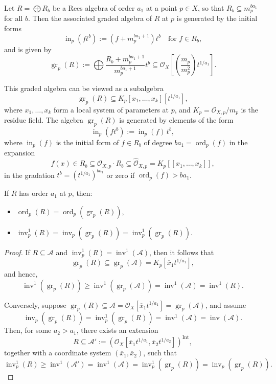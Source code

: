 \documentclass{amsart}
\newcommand{\inn}{\operatorname{in}}
\newcommand{\ord}{{\operatorname{ord}}}
\newcommand{\gr}{{\operatorname{gr}}}
\newcommand{\inv}{{\operatorname{inv}}}
\begin{document}
\begin{lemma} \label{g2}
Let \( R = \bigoplus R_b \) be a Rees algebra of order \( a_1 \) at a point \( p \in X \), so that \( R_b \subseteq m_p^{b a_1} \) for all \( b \). Then the associated graded algebra of \( R \) at \( p \) is generated by the initial forms
\[
\inn_p(f t^b) := (f + m_p^{b a_1 + 1}) t^b \quad \text{for } f \in R_b,
\]
and is given by
\[
\gr_p(R) := \bigoplus \frac{R_b + m_p^{b a_1 + 1}}{m_p^{b a_1 + 1}} t^b 
\subseteq \mathcal{O}_X\left[\left( \frac{m_p}{m_p^2} \right) t^{1/a_1} \right].
\]

This graded algebra can be viewed as a subalgebra
\[
\gr_p(R) \subseteq K_p[x_1, \ldots, x_k][t^{1/a_1}],
\]
where \( x_1, \ldots, x_k \) form a local system of parameters at \( p \), and \( K_p = \mathcal{O}_{X, p} / m_p \) is the residue field. The algebra \( \gr_p(R) \) is generated by elements of the form
\[
\inn_p(f t^b) := \inn_p(f)\, t^b,
\]
where \( \inn_p(f) \) is the initial form of \( f \in R_b \) of degree \( b a_1 = \ord_p(f) \) in the expansion
\[
f(x) \in R_b \subseteq \widehat{\mathcal{O}}_{X, p} \cdot R_b \subseteq \widehat{\mathcal{O}}_{X, p} = K_p[[x_1, \ldots, x_k]],
\]
in the gradation $t^b=(t^{1/a_1})^{ba_1}$ or zero if \( \ord_p(f) > b a_1 \).

\end{lemma}%
\begin{lemma}\label{g3}
If $R$ has order $a_1$ at $p$, then:
\begin{itemize}
  \item $\ord_p(R) = \ord_p(\gr_p(R))$,
  \item $\inv_p^1(R) = \inv_p(\gr_p(R)) = \inv_p^1(\gr_p(R))$.
\end{itemize}
\end{lemma}
\begin{proof}
If \( R \subseteq \mathcal{A} \) and \( \inv^1_p(R) = \inv^1(\mathcal{A}) \), then it follows that
\[
\gr_p(R) \subseteq \gr_p(\mathcal{A})=K_p[\overline{x}_1 t^{1/a_1}],
\]
and hence,
\[
\inv^1(\gr_p(R)) \geq \inv^1(\gr_p(\mathcal{A})) = \inv^1(\mathcal{A})= \inv^1(R).
\]

Conversely, suppose \( \gr_p(R) \subseteq \mathcal{A} = \mathcal{O}_X[\overline{x}_1 t^{1/a_1}]=\gr_p(\mathcal{A} )\), and assume
\[
\inv_p(\gr_p(R)) = \inv^1_p(\gr_p(R)) = \inv^1(\mathcal{A}) = \inv(\mathcal{A}).
\]
Then, for some \( a_2 > a_1 \), there exists an extension
\[
R \subseteq \mathcal{A}' := \left( \mathcal{O}_X[\overline{x}_1 t^{1/a_1}, \overline{x}_2 t^{1/a_2}] \right)^{\mathrm{Int}},
\]
together with a coordinate system \( (\overline{x}_1, \overline{x}_2) \), such that
\[
\inv^1_p(R) \geq \inv^1(\mathcal{A}') = \inv^1(\mathcal{A}) = \inv^1_p(\gr_p(R))= \inv_p(\gr_p(R)).
\]\end{proof}
\end{document}
